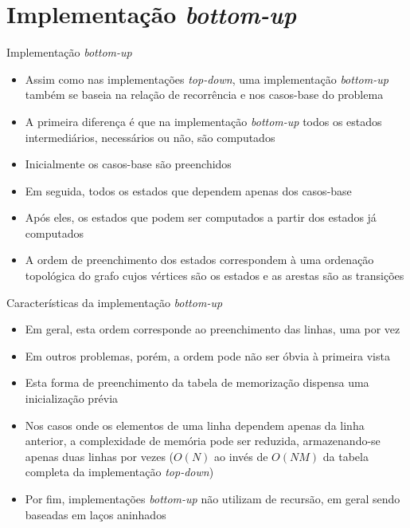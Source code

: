 \section{Implementação {\it bottom-up}}

\begin{frame}[fragile]{Implementação {\it bottom-up}}

    \begin{itemize}
        \item Assim como nas implementações \textit{top-down}, uma implementação \textit{bottom-up}
            também se baseia na relação de recorrência e nos casos-base do problema

        \item A primeira diferença é que na implementação \textit{bottom-up} todos os estados
            intermediários, necessários ou não, são computados

        \item Inicialmente os casos-base são preenchidos

        \item Em seguida, todos os estados que dependem apenas dos casos-base

        \item Após eles, os estados que podem ser computados a partir dos estados já computados

        \item A ordem de preenchimento dos estados correspondem à uma ordenação topológica do
            grafo cujos vértices são os estados e as arestas são as transições
    \end{itemize}

\end{frame}

\begin{frame}[fragile]{Características da implementação {\it bottom-up}}

    \begin{itemize}
        \item Em geral, esta ordem corresponde ao preenchimento das linhas, uma por vez

        \item Em outros problemas, porém, a ordem pode não ser óbvia à primeira vista

        \item Esta forma de preenchimento da tabela de memorização dispensa uma inicialização
            prévia

        \item Nos casos onde os elementos de uma linha dependem apenas da linha anterior, a
            complexidade de memória pode ser reduzida, armazenando-se apenas duas linhas por
            vezes ($O(N)$ ao invés de $O(NM)$ da tabela completa da implementação 
            \textit{top-down})

        \item Por fim, implementações \textit{bottom-up} não utilizam de recursão, em geral
            sendo baseadas em laços aninhados
    \end{itemize}

\end{frame}

